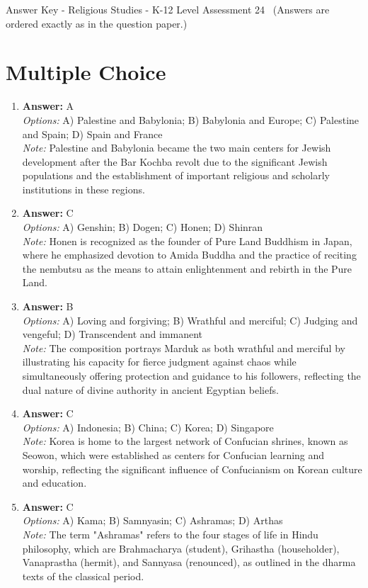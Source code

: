 \documentclass[12pt]{article}
\begin{document}
\begin{center}
Answer Key - Religious Studies - K-12 Level Assessment 24 \
\small (Answers are ordered exactly as in the question paper.)
\end{center}

\section*{Multiple Choice}
\begin{enumerate}[label=\arabic*.]
\item \textbf{Answer:} A
\\ \textit{Options:} A) Palestine and Babylonia; B) Babylonia and Europe; C) Palestine and Spain; D) Spain and France
\\ \textit{Note:} Palestine and Babylonia became the two main centers for Jewish development after the Bar Kochba revolt due to the significant Jewish populations and the establishment of important religious and scholarly institutions in these regions.
\item \textbf{Answer:} C
\\ \textit{Options:} A) Genshin; B) Dogen; C) Honen; D) Shinran
\\ \textit{Note:} Honen is recognized as the founder of Pure Land Buddhism in Japan, where he emphasized devotion to Amida Buddha and the practice of reciting the nembutsu as the means to attain enlightenment and rebirth in the Pure Land.
\item \textbf{Answer:} B
\\ \textit{Options:} A) Loving and forgiving; B) Wrathful and merciful; C) Judging and vengeful; D) Transcendent and immanent
\\ \textit{Note:} The composition portrays Marduk as both wrathful and merciful by illustrating his capacity for fierce judgment against chaos while simultaneously offering protection and guidance to his followers, reflecting the dual nature of divine authority in ancient Egyptian beliefs.
\item \textbf{Answer:} C
\\ \textit{Options:} A) Indonesia; B) China; C) Korea; D) Singapore
\\ \textit{Note:} Korea is home to the largest network of Confucian shrines, known as Seowon, which were established as centers for Confucian learning and worship, reflecting the significant influence of Confucianism on Korean culture and education.
\item \textbf{Answer:} C
\\ \textit{Options:} A) Kama; B) Samnyasin; C) Ashramas; D) Arthas
\\ \textit{Note:} The term "Ashramas" refers to the four stages of life in Hindu philosophy, which are Brahmacharya (student), Grihastha (householder), Vanaprastha (hermit), and Sannyasa (renounced), as outlined in the dharma texts of the classical period.
\end{enumerate}
\end{document}
